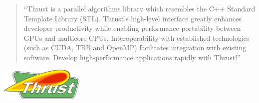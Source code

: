 \begin{frame}[fragile]


\vspace{4ex}
\begin{quotation}
``Thrust is a parallel algorithms library which resembles the C++ Standard Template Library (STL). Thrust's high-level interface greatly enhances developer productivity while enabling performance portability between GPUs and multicore CPUs. Interoperability with established technologies (such as CUDA, TBB and OpenMP) facilitates integration with existing software. Develop high-performance applications rapidly with Thrust!''
\end{quotation}

\vspace{2ex}

\centerline{\includegraphics[draft=false,width=0.3\textwidth]{thrust_logo.png}}
 

\end{frame}






